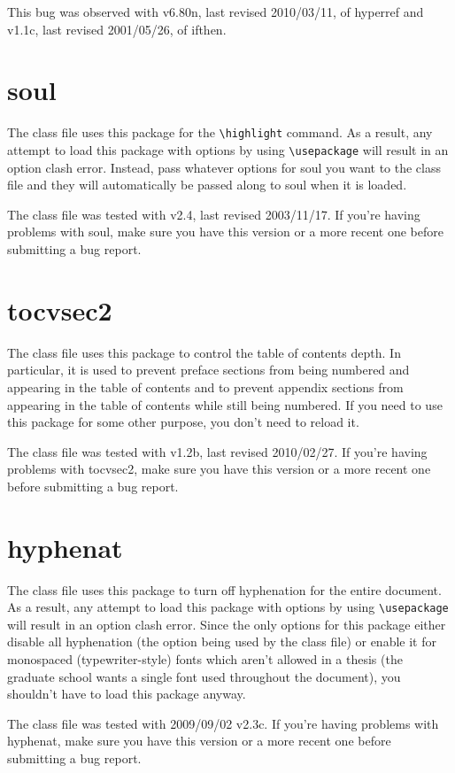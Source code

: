 This bug was observed with v6.80n, last revised 2010/03/11, of hyperref and v1.1c, last revised 2001/05/26, of ifthen.

\section{soul}
The class file uses this package for the \verb=\highlight= command.  As a result, any attempt to load this package with options by using \verb=\usepackage= will result in an option clash error.  Instead, pass whatever options for soul you want to the class file and they will automatically be passed along to soul when it is loaded.

The class file was tested with v2.4, last revised 2003/11/17.  If you're having problems with soul, make sure you have this version or a more recent one before submitting a bug report.

\section{tocvsec2}
The class file uses this package to control the table of contents depth.  In particular, it is used to prevent preface sections from being numbered and appearing in the table of contents and to prevent appendix sections from appearing in the table of contents while still being numbered.  If you need to use this package for some other purpose, you don't need to reload it.

The class file was tested with v1.2b, last revised 2010/02/27.  If you're having problems with tocvsec2, make sure you have this version or a more recent one before submitting a bug report.

\section{hyphenat}
The class file uses this package to turn off hyphenation for the entire document.  As a result, any attempt to load this package with options by using \verb=\usepackage= will result in an option clash error.  Since the only options for this package either disable all hyphenation (the option being used by the class file) or enable it for monospaced (typewriter-style) fonts which aren't allowed in a thesis (the graduate school wants a single font used throughout the document), you shouldn't have to load this package anyway.

The class file was tested with 2009/09/02 v2.3c.  If you're having problems with hyphenat, make sure you have this version or a more recent one before submitting a bug report.


